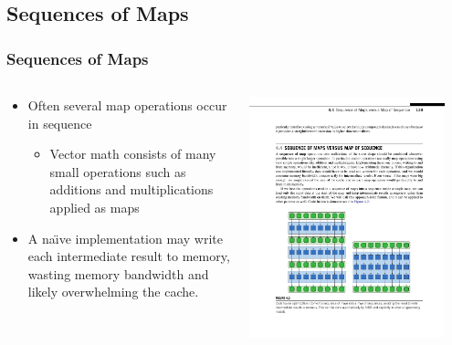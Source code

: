 \documentclass[xcolor=dvipsnames]{beamer}
\begin{document}
	\subsection{Sequences of Maps}
		\begin{frame} \frametitle{Sequences of Maps}
      		\begin{columns}
        		\begin{column}{0.48\textwidth}
          			\begin{itemize}
            			\item Often several map operations occur in sequence
							\begin{itemize}
	                			\item Vector math consists of many small 
                                operations such as additions and 
                                multiplications applied as maps
	              			\end{itemize}
            			\item A na\"\i ve implementation may write each 
                        intermediate result to memory, wasting memory 
                        bandwidth and likely overwhelming the cache.
          			\end{itemize}
        		\end{column}
        		\begin{column}{0.48\textwidth}
			        \centering
			        \includegraphics[width=0.9\textwidth]{images/figure-4-2-1}
		        \end{column}
			\end{columns}
		\end{frame}
\end{document}
